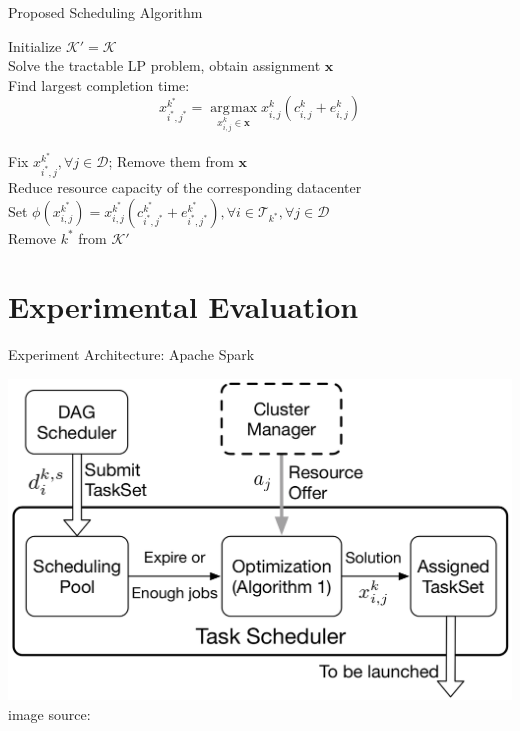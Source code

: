 \documentclass[presentation,professionalfonts]{beamer}
\DeclareMathOperator*{\argmax}{\arg\!\max}
\begin{document}
\begin{frame}{Proposed Scheduling Algorithm}
  \begin{algorithm}[H]

    Initialize \(\mathcal{K}' = \mathcal{K}\) \\
     {
      Solve the tractable LP problem, obtain assignment \(\bm{x}\) \\
      Find largest completion time: \[x_{i^*, j^*}^{k^*} = \argmax\limits_{x_{i, j}^k \in\bm{x}} x_{i, j}^k\left(c^k_{i, j} + e^k_{i, j}\right)\] \\
      Fix \(x_{i^*, j}^{k^*},\forall j\in\mathcal{D}\); Remove them from \(\bm{x}\) \\
      Reduce resource capacity of the corresponding datacenter \\
      Set \(\phi\left(x^{k^*}_{i, j}\right) = x^{k^*}_{i, j}\left(c^{k^*}_{i^*, j^*} + e^{k^*}_{i^*, j^*}\right),\forall i\in \mathcal{T}_{k^*}, \forall j\in \mathcal{D}\) \\
      Remove \(k^*\) from \(\mathcal{K}'\)
    }
  \end{algorithm}
\end{frame}

\section{Experimental Evaluation}

\begin{frame}{Experiment Architecture: Apache Spark}
  \begin{center}
  \includegraphics[width=\textwidth]{experiment_arch}\\
  image source: \textcite{Chen2017}
  \end{center}
  \end{frame}
\end{document}

